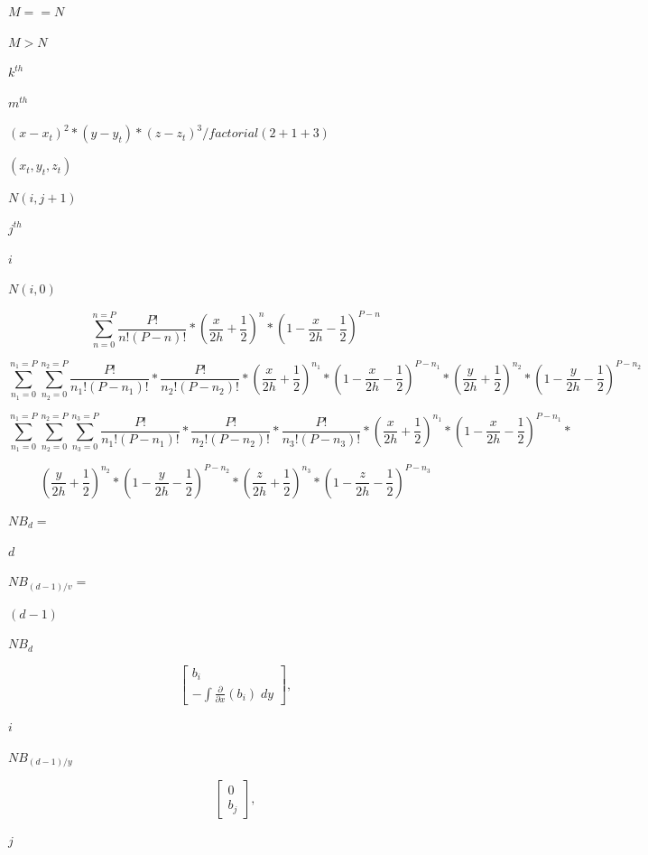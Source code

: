 \documentclass{article}
\begin{document}
$M==N$
\pagebreak

$M>N$
\pagebreak

$k^{th}$
\pagebreak

$m^{th}$
\pagebreak

$(x-x_t)^2*(y-y_t)*(z-z_t)^3/factorial(2+1+3)$
\pagebreak

$(x_t,y_t,z_t)$
\pagebreak

$ N(i,j+1) $
\pagebreak

$ j^{th} $
\pagebreak

$ i $
\pagebreak

$ N(i,0) $
\pagebreak

\[\sum_{n=0}^{n=P} \frac{P!}{n!(P-n)!}*\left(\frac{x}{2h}+\frac{1}{2}\right)^n*\left(1-\frac{x}{2h}-\frac{1}{2}\right)^{P-n}\]
\pagebreak

\[\sum_{n_1=0}^{n_1=P}\sum_{n_2=0}^{n_2=P} \frac{P!}{n_1!(P-n_1)!}*\frac{P!}{n_2!(P-n_2)!}*\left(\frac{x}{2h}+\frac{1}{2}\right)^{n_1}*\left(1-\frac{x}{2h}-\frac{1}{2}\right)^{P-n_1}*\left(\frac{y}{2h}+\frac{1}{2}\right)^{n_2}*\left(1-\frac{y}{2h}-\frac{1}{2}\right)^{P-n_2}\]
\pagebreak

\[\sum_{n_1=0}^{n_1=P}\sum_{n_2=0}^{n_2=P}\sum_{n_3=0}^{n_3=P} \frac{P!}{n_1!(P-n_1)!}*\frac{P!}{n_2!(P-n_2)!}*\frac{P!}{n_3!(P-n_3)!}*\left(\frac{x}{2h}+\frac{1}{2}\right)^{n_1}*\left(1-\frac{x}{2h}-\frac{1}{2}\right)^{P-n_1}*\]
\pagebreak

\[\left(\frac{y}{2h}+\frac{1}{2}\right)^{n_2}*\left(1-\frac{y}{2h}-\frac{1}{2}\right)^{P-n_2}*\left(\frac{z}{2h}+\frac{1}{2}\right)^{n_3}*\left(1-\frac{z}{2h}-\frac{1}{2}\right)^{P-n_3}\]
\pagebreak

$NB_d=$
\pagebreak

$d$
\pagebreak

$NB_{(d-1)/v}=$
\pagebreak

$(d-1)$
\pagebreak

$NB_d$
\pagebreak

\[\begin{bmatrix}b_i\\ -\int \frac{\partial}{\partial x}(b_i)\; dy\end{bmatrix},\]
\pagebreak

$i$
\pagebreak

$NB_{(d-1)/y}$
\pagebreak

\[\begin{bmatrix}0\\b_j\end{bmatrix},\]
\pagebreak

$j$
\pagebreak
\end{document}
